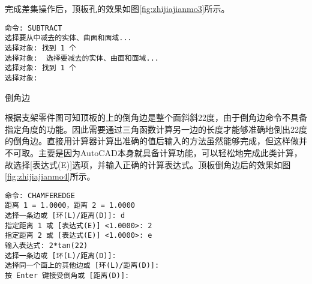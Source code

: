 \begin{procedure}
\begin{enumerate}
完成差集操作后，顶板孔的效果如图\ref{fig:zhijiajianmo3}所示。
\begin{lstlisting}
命令: SUBTRACT 
选择要从中减去的实体、曲面和面域...
选择对象: 找到 1 个
选择对象:  选择要减去的实体、曲面和面域...
选择对象: 找到 1 个
选择对象:
\end{lstlisting}

\end{enumerate}

\begin{figure}[htbp]
\centering
\begin{floatrow}[2]
\end{floatrow}
\end{figure}
\item 倒角边

根据支架零件图可知顶板的上的倒角边是整个面斜斜22度，由于倒角边命令不具备指定角度的功能。因此需要通过三角函数计算另一边的长度才能够准确地倒出22度的倒角边。直接用计算器计算出准确的值后输入的方法虽然能够完成，但这样做并不可取。主要是因为AutoCAD本身就具备计算功能，可以轻松地完成此类计算，故选择[表达式(E)]选项，并输入正确的计算表达式。顶板倒角边后的效果如图\ref{fig:zhijiajianmo4}所示。


\begin{lstlisting}
命令: CHAMFEREDGE
距离 1 = 1.0000，距离 2 = 1.0000
选择一条边或 [环(L)/距离(D)]: d
指定距离 1 或 [表达式(E)] <1.0000>: 2
指定距离 2 或 [表达式(E)] <1.0000>: e
输入表达式: 2*tan(22)
选择一条边或 [环(L)/距离(D)]:
选择同一个面上的其他边或 [环(L)/距离(D)]:
按 Enter 键接受倒角或 [距离(D)]:
\end{lstlisting}

\end{procedure}

